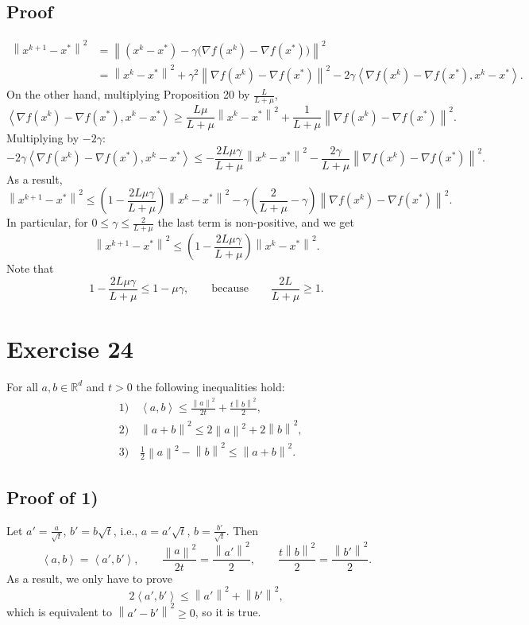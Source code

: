 \documentclass[11pt,a4paper]{article}
\newcommand{\R}{\mathbb{R}}
\newcommand{\norm}[1]{\left\| #1 \right\|}
\newcommand{\ip}[2]{\left\langle #1, #2 \right\rangle}
\begin{document}
\subsection*{Proof}
\begin{align*}
  \norm{x^{k+1} - x^*}^2
  &= \norm{(x^k - x^*) - \gamma\bigl(\nabla f(x^k) - \nabla f(x^*)\bigr)}^2 \\
  &= \norm{x^k - x^*}^2 + \gamma^2\norm{\nabla f(x^k) - \nabla f(x^*)}^2
     - 2\gamma\ip{\nabla f(x^k) - \nabla f(x^*)}{x^k - x^*} .
\end{align*}
On the other hand, multiplying Proposition 20 by $\frac{L}{L+\mu}$,
\[
  \ip{\nabla f(x^k) - \nabla f(x^*)}{x^k - x^*}
  \ge \frac{L\mu}{L+\mu}\norm{x^k - x^*}^2 + \frac{1}{L+\mu}\norm{\nabla f(x^k) - \nabla f(x^*)}^2 .
\]
Multiplying by $-2\gamma$:
\[
  -2\gamma\ip{\nabla f(x^k) - \nabla f(x^*)}{x^k - x^*}
  \le -\frac{2L\mu\gamma}{L+\mu}\norm{x^k - x^*}^2 - \frac{2\gamma}{L+\mu}\norm{\nabla f(x^k) - \nabla f(x^*)}^2 .
\]
As a result,
\[
  \norm{x^{k+1} - x^*}^2
  \le \left(1 - \frac{2L\mu\gamma}{L+\mu}\right)\norm{x^k - x^*}^2
  - \gamma\left(\frac{2}{L+\mu} - \gamma\right)\norm{\nabla f(x^k) - \nabla f(x^*)}^2 .
\]
In particular, for $0 \le \gamma \le \frac{2}{L+\mu}$ the last term is non-positive, and we get
\[
  \norm{x^{k+1} - x^*}^2 \le \left(1 - \frac{2L\mu\gamma}{L+\mu}\right)\norm{x^k - x^*}^2 .
\]
Note that
\[
  1 - \frac{2L\mu\gamma}{L+\mu} \le 1 - \mu\gamma,
  \qquad \text{because} \qquad \frac{2L}{L+\mu} \ge 1 .
\]

\section*{Exercise 24}

For all $a, b \in \R^d$ and $t > 0$ the following inequalities hold:
\begin{align*}
  &1)\quad \ip{a}{b} \le \frac{\norm{a}^2}{2t} + \frac{t\norm{b}^2}{2}, \\
  &2)\quad \norm{a+b}^2 \le 2\norm{a}^2 + 2\norm{b}^2, \\
  &3)\quad \frac{1}{2}\norm{a}^2 - \norm{b}^2 \le \norm{a+b}^2 .
\end{align*}

\subsection*{Proof of 1)}
Let $a' = \frac{a}{\sqrt{t}}$, $b' = b\sqrt{t}$, i.e., $a = a'\sqrt{t}$, $b = \frac{b'}{\sqrt{t}}$. Then
\[
  \ip{a}{b} = \ip{a'}{b'}, \qquad
  \frac{\norm{a}^2}{2t} = \frac{\norm{a'}^2}{2}, \qquad
  \frac{t\norm{b}^2}{2} = \frac{\norm{b'}^2}{2}.
\]
As a result, we only have to prove
\[
  2\ip{a'}{b'} \le \norm{a'}^2 + \norm{b'}^2,
\]
which is equivalent to $\norm{a'-b'}^2 \ge 0$, so it is true.
\end{document}
